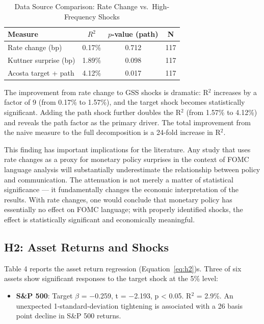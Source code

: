 \documentclass[12pt]{article}
\begin{document}
\begin{table}[htbp]\centering\caption{Data Source Comparison: Rate Change vs.\ High-Frequency Shocks}\label{tab:comparison}
\begin{tabular}{lccc}\toprule
Measure & $R^2$ & $p$-value (path) & N \\\midrule
Rate change (bp) & 0.17\% & 0.712 & 117 \\
Kuttner surprise (bp) & 1.89\% & 0.098 & 117 \\
Acosta target + path & 4.12\% & 0.017 & 117 \\\bottomrule\end{tabular}
\par\vspace{2pt}{\footnotesize All regressions include Newey-West HAC standard errors with lag=4.}\end{table}


The improvement from rate change to GSS shocks is dramatic: R$^2$ increases by a factor of 9 (from 0.17\% to 1.57\%), and the target shock becomes statistically significant. Adding the path shock further doubles the R$^2$ (from 1.57\% to 4.12\%) and reveals the path factor as the primary driver. The total improvement from the naive measure to the full decomposition is a 24-fold increase in R$^2$.

This finding has important implications for the literature. Any study that uses rate changes as a proxy for monetary policy surprises in the context of FOMC language analysis will substantially underestimate the relationship between policy and communication. The attenuation is not merely a matter of statistical significance --- it fundamentally changes the economic interpretation of the results. With rate changes, one would conclude that monetary policy has essentially no effect on FOMC language; with properly identified shocks, the effect is statistically significant and economically meaningful.

\subsection{H2: Asset Returns and Shocks}

Table 4 reports the asset return regression (Equation~\eqref{eq:h2})s. Three of six assets show significant responses to the target shock at the 5\% level:

\begin{itemize}
\item \textbf{S\&P 500}: Target $\beta$ = $-$0.259, t = $-$2.193, p < 0.05. R$^2$ = 2.9\%. An unexpected 1-standard-deviation tightening is associated with a 26 basis point decline in S\&P 500 returns.
\end{itemize}
\end{document}
